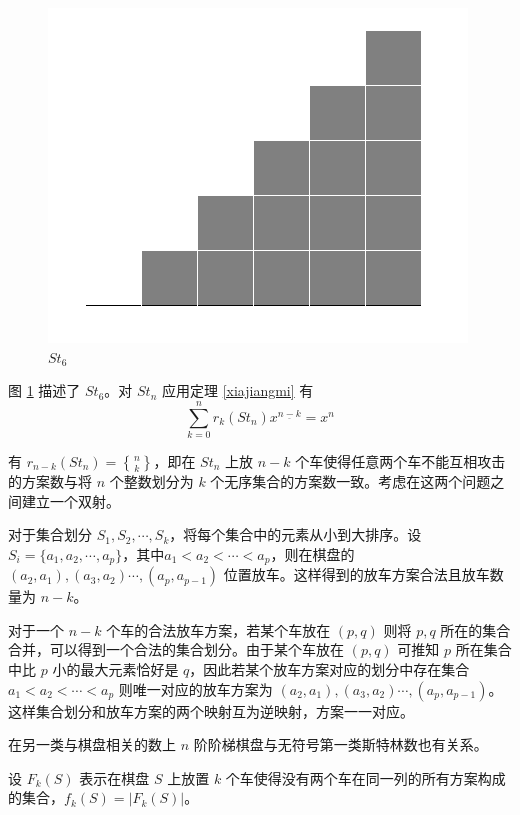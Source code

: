\documentclass{noithesis}
\begin{document}
	\begin{figure}[h]
		\centering
		\caption{$St_6$}
		\label{f6}
		\includegraphics[scale=0.35]{picture/figure6.png}
	\end{figure}

	图 \ref{f6} 描述了 $St_6$。对 $St_n$ 应用定理 \ref{xiajiangmi} 有 \begin{equation}
	\sum_{k=0}^n r_k(St_n) x^{\underline{n-k}} = x^n
	\end{equation}
	
	有 $r_{n-k}(St_n) = {n \brace k}$，即在 $St_n$ 上放 $n-k$ 个车使得任意两个车不能互相攻击的方案数与将 $n$ 个整数划分为 $k$ 个无序集合的方案数一致。考虑在这两个问题之间建立一个双射。
	
	对于集合划分 $S_1,S_2,\cdots,S_k$，将每个集合中的元素从小到大排序。设 $S_i = \{a_1,a_2,\cdots,a_p\}$，其中$a_1<a_2<\cdots<a_p$，则在棋盘的 $(a_2,a_1),(a_3,a_2)\cdots,(a_p,a_{p-1})$ 位置放车。这样得到的放车方案合法且放车数量为 $n-k$。
	
	对于一个 $n-k$ 个车的合法放车方案，若某个车放在 $(p,q)$ 则将 $p,q$ 所在的集合合并，可以得到一个合法的集合划分。由于某个车放在 $(p,q)$ 可推知 $p$ 所在集合中比 $p$ 小的最大元素恰好是 $q$，因此若某个放车方案对应的划分中存在集合 $a_1<a_2<\cdots<a_p$ 则唯一对应的放车方案为 $(a_2,a_1),(a_3,a_2)\cdots,(a_p,a_{p-1})$。这样集合划分和放车方案的两个映射互为逆映射，方案一一对应。
	
	在另一类与棋盘相关的数上 $n$ 阶阶梯棋盘与无符号第一类斯特林数也有关系。
	\begin{definition}
		设 $F_k(S)$ 表示在棋盘 $S$ 上放置 $k$ 个车使得没有两个车在同一列的所有方案构成的集合，$f_k(S) = |F_k(S)|$。
	\end{definition}
\end{document}
